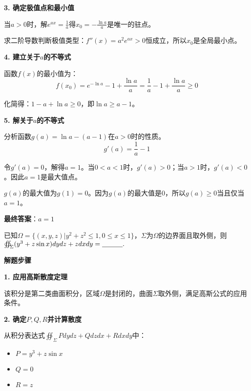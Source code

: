 \documentclass[standard]{ExBook}
\begin{document}
\begin{qitems}
\begin{bbox}
\begin{solution}
            \textbf{3. 确定极值点和最小值}
            
            当$a>0$时，解$e^{ax}=\frac{1}{a}$得$x_0 = -\frac{\ln a}{a}$是唯一的驻点。
            
            求二阶导数判断极值类型：$f''(x) = a^2 e^{ax} > 0$恒成立，所以$x_0$是全局最小点。
            
            \textbf{4. 建立关于$a$的不等式}
            
            函数$f(x)$的最小值为：
            $$f(x_0) = e^{-\ln a} - 1 + \frac{\ln a}{a} = \frac{1}{a} - 1 + \frac{\ln a}{a} \ge 0$$
            
            化简得：$1 - a + \ln a \ge 0$，即$\ln a \ge a - 1$。
            
            \textbf{5. 解关于$a$的不等式}
            
            分析函数$g(a) = \ln a - (a-1)$在$a>0$时的性质。
            $$g'(a) = \frac{1}{a} - 1$$
            
            令$g'(a)=0$，解得$a=1$。当$0<a<1$时，$g'(a)>0$；当$a>1$时，$g'(a)<0$。因此$a=1$是最大值点。
            
            $g(a)$的最大值为$g(1) = 0$。因为$g(a)$的最大值是$0$，所以$g(a)\ge 0$当且仅当$a=1$。
            
            \textbf{最终答案}：$a=1$
        \end{solution}
    \end{bbox}

    \begin{bbox}
        \qitem 已知$\Omega=\{(x,y,z)|y^2+z^2\le 1, 0\le x\le 1\}$，$\Sigma$为$\Omega$的边界面且取外侧，则$\oiint_{\Sigma} (y^3+z\sin x)dydz + zdxdy=\underline{\hspace{3em}}.$
        \begin{solution}
            \textbf{解题步骤}
            
            \textbf{1. 应用高斯散度定理}
            
            该积分是第二类曲面积分，区域$\Omega$是封闭的，曲面$\Sigma$取外侧，满足高斯公式的应用条件。
            
            \textbf{2. 确定$P, Q, R$并计算散度}
            
            从积分表达式$\oiint_{\Sigma} Pdydz + Qdzdx + Rdxdy$中：
            \begin{itemize}
                \item $P = y^3+z\sin x$
                \item $Q = 0$
                \item $R = z$
            \end{itemize}
            

\end{solution}
\end{bbox}
\end{qitems}
\end{document}
